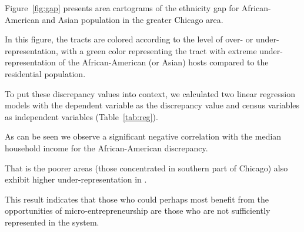 Figure~\ref{fig:gap} presents area cartograms  of the ethnicity gap for African-American and Asian population in the greater Chicago area.

In this figure, the tracts are colored according to the level of over- or under-representation, with a green color representing the tract with extreme under-representation of the African-American (or Asian) hosts compared to the residential population.

To put these discrepancy values into context,  we calculated two linear regression models with the dependent variable as the discrepancy value and census variables as independent variables (Table~\ref{tab:reg}).

As can be seen we observe a significant negative correlation with the median household income for the African-American discrepancy.

That is the poorer areas (those concentrated in southern part of Chicago) also exhibit higher under-representation in \ab.

This result indicates that those who could perhaps most benefit from the opportunities of micro-entrepreneurship are those who are not sufficiently represented in the system.  

